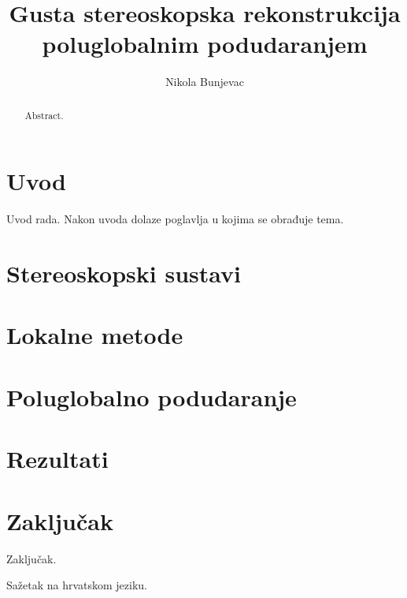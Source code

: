 \documentclass[times, utf8, zavrsni]{fer}
\begin{document}

\title{Gusta stereoskopska rekonstrukcija poluglobalnim podudaranjem}

\author{Nikola Bunjevac}

\maketitle

\izvornik

\zahvala{}

\tableofcontents

\chapter{Uvod}
Uvod rada. Nakon uvoda dolaze poglavlja u kojima se obrađuje tema.

\chapter{Stereoskopski sustavi}

\chapter{Lokalne metode}

\chapter{Poluglobalno podudaranje}

\chapter{Rezultati}

\chapter{Zaključak}
Zaključak.




\begin{sazetak}
  Sažetak na hrvatskom jeziku.

\end{sazetak}

\begin{abstract}
Abstract.

\end{abstract}
\end{document}

